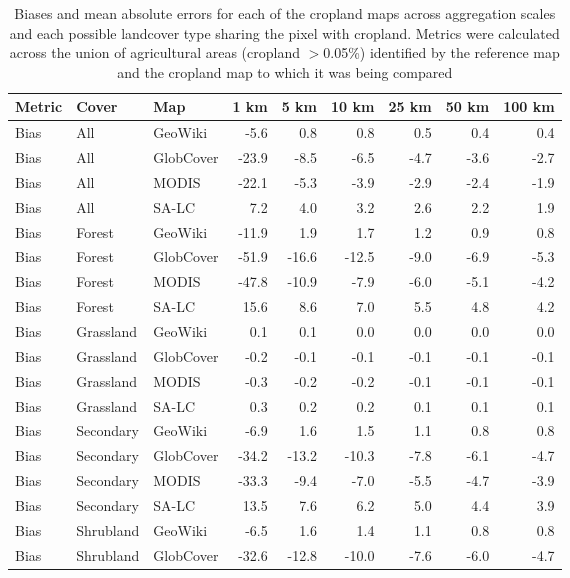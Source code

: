 \begin{longtable}{lllrrrrrr}
\caption{Biases and mean absolute errors for each of the cropland maps across aggregation scales and each possible landcover type sharing the pixel with cropland. Metrics were calculated across the union of agricultural areas (cropland $>$0.05\%) identified by the reference map and the cropland map to which it was being compared} \\ 
  \hline
Metric & Cover & Map & 1 km & 5 km & 10 km & 25 km & 50 km & 100 km \\ 
  \hline
Bias & All & GeoWiki & -5.6 & 0.8 & 0.8 & 0.5 & 0.4 & 0.4 \\ 
  Bias & All & GlobCover & -23.9 & -8.5 & -6.5 & -4.7 & -3.6 & -2.7 \\ 
  Bias & All & MODIS & -22.1 & -5.3 & -3.9 & -2.9 & -2.4 & -1.9 \\ 
  Bias & All & SA-LC & 7.2 & 4.0 & 3.2 & 2.6 & 2.2 & 1.9 \\ 
  Bias & Forest & GeoWiki & -11.9 & 1.9 & 1.7 & 1.2 & 0.9 & 0.8 \\ 
  Bias & Forest & GlobCover & -51.9 & -16.6 & -12.5 & -9.0 & -6.9 & -5.3 \\ 
  Bias & Forest & MODIS & -47.8 & -10.9 & -7.9 & -6.0 & -5.1 & -4.2 \\ 
  Bias & Forest & SA-LC & 15.6 & 8.6 & 7.0 & 5.5 & 4.8 & 4.2 \\ 
  Bias & Grassland & GeoWiki & 0.1 & 0.1 & 0.0 & 0.0 & 0.0 & 0.0 \\ 
  Bias & Grassland & GlobCover & -0.2 & -0.1 & -0.1 & -0.1 & -0.1 & -0.1 \\ 
  Bias & Grassland & MODIS & -0.3 & -0.2 & -0.2 & -0.1 & -0.1 & -0.1 \\ 
  Bias & Grassland & SA-LC & 0.3 & 0.2 & 0.2 & 0.1 & 0.1 & 0.1 \\ 
  Bias & Secondary & GeoWiki & -6.9 & 1.6 & 1.5 & 1.1 & 0.8 & 0.8 \\ 
  Bias & Secondary & GlobCover & -34.2 & -13.2 & -10.3 & -7.8 & -6.1 & -4.7 \\ 
  Bias & Secondary & MODIS & -33.3 & -9.4 & -7.0 & -5.5 & -4.7 & -3.9 \\ 
  Bias & Secondary & SA-LC & 13.5 & 7.6 & 6.2 & 5.0 & 4.4 & 3.9 \\ 
  Bias & Shrubland & GeoWiki & -6.5 & 1.6 & 1.4 & 1.1 & 0.8 & 0.8 \\ 
  Bias & Shrubland & GlobCover & -32.6 & -12.8 & -10.0 & -7.6 & -6.0 & -4.7 \\ 

\end{longtable}
